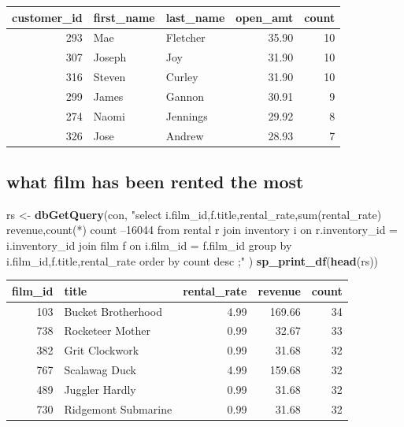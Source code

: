 \documentclass[]{book}
\newenvironment{Shaded}{\begin{snugshade}}{\end{snugshade}}
\newcommand{\KeywordTok}[1]{\textcolor[rgb]{0.13,0.29,0.53}{\textbf{#1}}}
\newcommand{\NormalTok}[1]{#1}
\newcommand{\StringTok}[1]{\textcolor[rgb]{0.31,0.60,0.02}{#1}}
\theoremstyle{definition}
\theoremstyle{definition}
\theoremstyle{definition}
\theoremstyle{remark}
\begin{document}
\begin{tabular}{r|l|l|r|r}
\hline
customer\_id & first\_name & last\_name & open\_amt & count\\
\hline
293 & Mae & Fletcher & 35.90 & 10\\
\hline
307 & Joseph & Joy & 31.90 & 10\\
\hline
316 & Steven & Curley & 31.90 & 10\\
\hline
299 & James & Gannon & 30.91 & 9\\
\hline
274 & Naomi & Jennings & 29.92 & 8\\
\hline
326 & Jose & Andrew & 28.93 & 7\\
\hline
\end{tabular}

\hypertarget{what-film-has-been-rented-the-most}{%
\subsection{what film has been rented the
most}\label{what-film-has-been-rented-the-most}}

\begin{Shaded}
\begin{Highlighting}[]
\NormalTok{rs <-}\StringTok{ }\KeywordTok{dbGetQuery}\NormalTok{(con,}
                \StringTok{"select i.film_id,f.title,rental_rate,sum(rental_rate) revenue,count(*) count  --16044}
\StringTok{                   from rental r }
\StringTok{                        join inventory i}
\StringTok{                          on r.inventory_id = i.inventory_id}
\StringTok{                        join film f}
\StringTok{                          on i.film_id = f.film_id}
\StringTok{                 group by i.film_id,f.title,rental_rate}
\StringTok{                 order by count desc}
\StringTok{                 ;"}
\NormalTok{                )  }
\KeywordTok{sp_print_df}\NormalTok{(}\KeywordTok{head}\NormalTok{(rs))}
\end{Highlighting}
\end{Shaded}

\begin{tabular}{r|l|r|r|r}
\hline
film\_id & title & rental\_rate & revenue & count\\
\hline
103 & Bucket Brotherhood & 4.99 & 169.66 & 34\\
\hline
738 & Rocketeer Mother & 0.99 & 32.67 & 33\\
\hline
382 & Grit Clockwork & 0.99 & 31.68 & 32\\
\hline
767 & Scalawag Duck & 4.99 & 159.68 & 32\\
\hline
489 & Juggler Hardly & 0.99 & 31.68 & 32\\
\hline
730 & Ridgemont Submarine & 0.99 & 31.68 & 32\\
\hline
\end{tabular}
\end{document}
